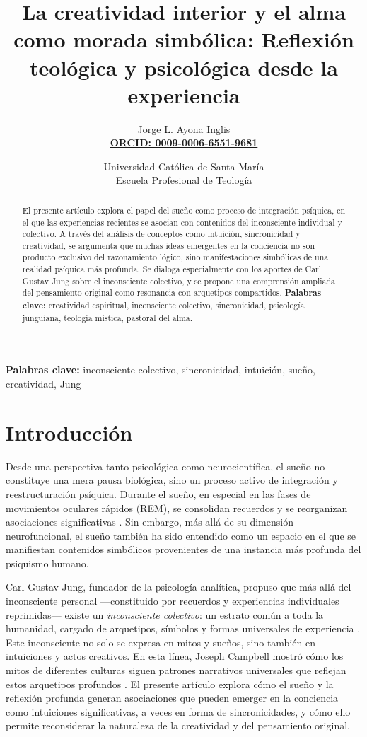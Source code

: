 \documentclass[a4paper,12pt]{article}
\title{La creatividad interior y el alma como morada
	simbólica:
	Reflexión teológica y psicológica desde la experiencia}
\author{Jorge L. Ayona Inglis \\
	\href{https://orcid.org/0009-0006-6551-9681}{\textbf{ORCID: 0009-0006-6551-9681}}}
\date{Universidad Católica de Santa María \\
	Escuela Profesional de Teología}
\begin{document}
	
	\maketitle
	
	\begin{abstract}
		El presente artículo explora el papel del sueño como proceso de integración psíquica, en el que las experiencias recientes se asocian con contenidos del inconsciente individual y colectivo. A través del análisis de conceptos como intuición, sincronicidad y creatividad, se argumenta que muchas ideas emergentes en la conciencia no son producto exclusivo del razonamiento lógico, sino manifestaciones simbólicas de una realidad psíquica más profunda. Se dialoga especialmente con los aportes de Carl Gustav Jung sobre el inconsciente colectivo, y se propone una comprensión ampliada del pensamiento original como resonancia con arquetipos compartidos.
		\textbf{Palabras clave:} creatividad espiritual, inconsciente colectivo, sincronicidad, psicología junguiana, teología mística, pastoral del alma.
		
	\end{abstract}
	
	\textbf{Palabras clave:} inconsciente colectivo, sincronicidad, intuición, sueño, creatividad, Jung
	
\section*{Introducción}

Desde una perspectiva tanto psicológica como neurocientífica, el sueño no constituye una mera pausa biológica, sino un proceso activo de integración y reestructuración psíquica. Durante el sueño, en especial en las fases de movimientos oculares rápidos (REM), se consolidan recuerdos y se reorganizan asociaciones significativas \cite{damasio1999,eagleman2011}. Sin embargo, más allá de su dimensión neurofuncional, el sueño también ha sido entendido como un espacio en el que se manifiestan contenidos simbólicos provenientes de una instancia más profunda del psiquismo humano.

Carl Gustav Jung, fundador de la psicología analítica, propuso que más allá del inconsciente personal —constituido por recuerdos y experiencias individuales reprimidas— existe un \textit{inconsciente colectivo}: un estrato común a toda la humanidad, cargado de arquetipos, símbolos y formas universales de experiencia \cite{jung1959}. Este inconsciente no solo se expresa en mitos y sueños, sino también en intuiciones y actos creativos. En esta línea, Joseph Campbell mostró cómo los mitos de diferentes culturas siguen patrones narrativos universales que reflejan estos arquetipos profundos \cite{campbell1949}. El presente artículo explora cómo el sueño y la reflexión profunda generan asociaciones que pueden emerger en la conciencia como intuiciones significativas, a veces en forma de sincronicidades, y cómo ello permite reconsiderar la naturaleza de la creatividad y del pensamiento original.
\end{document}

